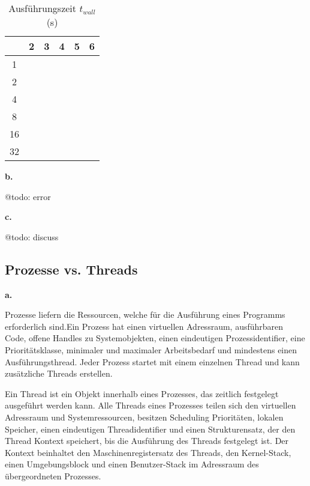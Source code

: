 \documentclass[12pt]{article}
\begin{document}
\begin{table}[ht]
	\centering
	\caption[Ausführungszeit $t_{wall}$ (\si{\second})]{Ausführungszeit $t_{wall}$ (\si{\second})}
	\begin{tabular}{c|l|l|l|l|l}
		\hline
		\cellcolor{gray!40}\textbf{\diagbox{Threads}{n}} & \multicolumn{1}{c}{\cellcolor{gray!40}\textbf{2}} & \multicolumn{1}{c}{\cellcolor{gray!40}\textbf{3}} & \multicolumn{1}{c}{\cellcolor{gray!40}\textbf{4}} &
		\multicolumn{1}{c}{\cellcolor{gray!40}\textbf{5}} &
		\multicolumn{1}{c}{\cellcolor{gray!40}\textbf{6}} \\
		\hline\hline
		1 &  &  & & & \\\hline
		2 &  &  & & & \\\hline
		4 &  &  & & & \\\hline
		8 &  &  & & & \\\hline
		16 &  &  & & & \\\hline
		32 &  &  & & & \\\hline
	\end{tabular}
	\label{tab:twall}
\end{table}

\noindent \textbf{b.}

@todo: error

\noindent \textbf{c.}

@todo: discuss

\subsection{Prozesse vs. Threads}

\noindent \textbf{a.}

Prozesse liefern die Ressourcen, welche für die Ausführung eines Programms erforderlich sind.Ein Prozess hat einen virtuellen Adressraum, ausführbaren Code, offene Handles zu Systemobjekten, einen eindeutigen Prozessidentifier, eine Prioritätsklasse, minimaler und maximaler Arbeitsbedarf und mindestens einen Ausführungsthread. Jeder Prozess startet mit einem einzelnen Thread und kann zusätzliche Threads erstellen.

Ein Thread ist ein Objekt innerhalb eines Prozesses, das zeitlich festgelegt ausgeführt werden kann. Alle Threads eines Prozesses teilen sich den virtuellen Adressraum und Systemressourcen, besitzen Scheduling Prioritäten, lokalen Speicher, einen eindeutigen Threadidentifier und einen Strukturensatz, der den Thread Kontext speichert, bis die Ausführung des Threads festgelegt ist. Der Kontext beinhaltet den Maschinenregistersatz des Threads, den Kernel-Stack, einen Umgebungsblock und einen Benutzer-Stack im Adressraum des übergeordneten Prozesses.
\end{document}

